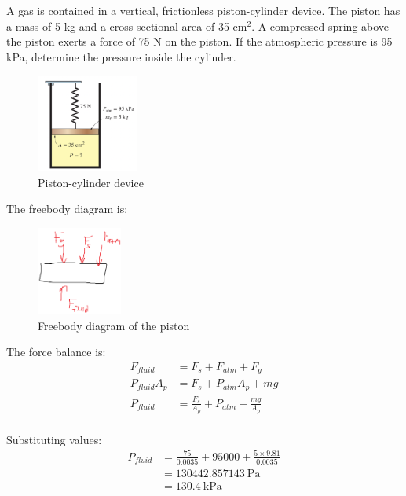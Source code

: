 \section{}
A gas is contained in a vertical, frictionless piston-cylinder device. The piston has a mass 
of 5 kg and a cross-sectional area of 35 cm$^2$. A compressed spring above the piston exerts a 
force of 75 N on the piston. If the atmospheric pressure is 95 kPa, determine the pressure inside 
the cylinder.

\begin{figure}[h]
    \centering
    \includegraphics[width=0.3\textwidth]{Questions/Figures/Q2ProblemDiagram.png}
    \caption{Piston-cylinder device}
    \label{fig:Q2ProblemDiagram}
\end{figure}

The freebody diagram is:
\begin{figure}[h]
    \centering
    \includegraphics[width=0.25\textwidth]{Questions/Figures/Q2FBD.png}
    \caption{Freebody diagram of the piston}
    \label{fig:Q2FreeBodyDiagram}
\end{figure}

The force balance is:
\begin{align}
    F_{fluid} &= F_{s} + F_{atm} + F_{g}\\
    P_{fluid}A_{p} &= F_{s} + P_{atm}A_{p} + mg\\
    P_{fluid} &= \frac{F_{s}}{A_{p}} + P_{atm} + \frac{mg}{A_{p}}\\
\end{align}

Substituting values:
\begin{align}
    P_{fluid} &= \frac{75}{0.0035} + 95000 + \frac{5\times9.81}{0.0035}\\
            &= \qty{130442.857143}{\pascal} \\
            &= \boxed{\qty{130.4}{\kilo\pascal}}
\end{align}